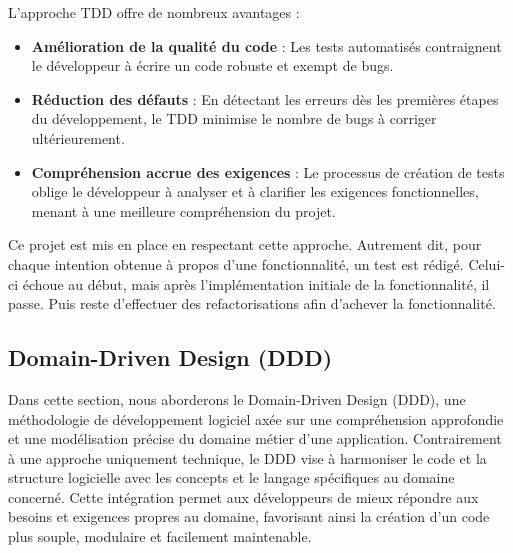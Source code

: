 L'approche TDD offre de nombreux avantages :
\begin{itemize}
    \item \textbf{Amélioration de la qualité du code} : Les tests automatisés contraignent le développeur à écrire un code robuste et exempt de bugs.

    \item \textbf{Réduction des défauts} : En détectant les erreurs dès les premières étapes du développement, le TDD minimise le nombre de bugs à corriger ultérieurement.

    \item \textbf{Compréhension accrue des exigences} : Le processus de création de tests oblige le développeur à analyser et à clarifier les exigences fonctionnelles, menant à une meilleure compréhension du projet.
\end{itemize}

Ce projet est mis en place en respectant cette approche. Autrement dit, pour chaque intention obtenue à propos d’une fonctionnalité, un test est rédigé. Celui-ci échoue au début, mais après l’implémentation initiale de la fonctionnalité, il passe. Puis reste d’effectuer des refactorisations afin d’achever la fonctionnalité.



\subsection{Domain-Driven Design (DDD)}

Dans cette section, nous aborderons le Domain-Driven Design (DDD), une méthodologie de développement logiciel axée sur une compréhension approfondie et une modélisation précise du domaine métier d'une application. Contrairement à une approche uniquement technique, le DDD vise à harmoniser le code et la structure logicielle avec les concepts et le langage spécifiques au domaine concerné. Cette intégration permet aux développeurs de mieux répondre aux besoins et exigences propres au domaine, favorisant ainsi la création d'un code plus souple, modulaire et facilement maintenable. 




